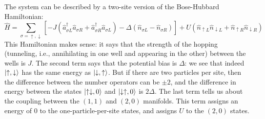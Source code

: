 \documentclass{book}
\theoremstyle{definition}
\newcommand{\lp}{\left(}
\newcommand{\rp}{\right)}
\newcommand{\lb}{\left[}
\newcommand{\rb}{\right]}
\begin{document}
The system can be described by a two-site version of the Bose-Hubbard Hamiltonian:
\begin{equation*}
\widehat{H}= \sum_{\sigma = \uparrow,\downarrow}\lb -J\lp \widehat{a}^\dagger_{\sigma L}\widehat{a}_{\sigma R} + \widehat{a}^\dagger_{\sigma R}\widehat{a}_{\sigma L} \rp  - \Delta(\widehat{n}_{\sigma L} - \widehat{n}_{\sigma R} )  \rb + U\lp \widehat{n}_{\uparrow L} \widehat{n}_{\downarrow L} + \widehat{n}_{\uparrow R}\widehat{n}_{\downarrow R} \rp
\end{equation*}
This Hamiltonian makes sense: it says that the strength of the hopping (tunneling, i.e., annihilating in one well and appearing in the other) between the wells is $J$. The second term says that the potential bias is $\Delta$: we see that indeed $\ket{\uparrow,\downarrow}$ has the same energy as $\ket{\downarrow,\uparrow}$. But if there are two particles per site, then the difference between the number operators can be $\pm 2$, and the difference in energy between the states $\ket{\uparrow\downarrow,0}$ and $\ket{\downarrow\uparrow,0}$ is $2\Delta$. The last term tells us about the coupling between the $(1,1)$ and $(2,0)$ manifolds. This term assigns an energy of $0$ to the one-particle-per-site states, and assigns $U$ to the $(2,0)$ states. \\
\end{document}
